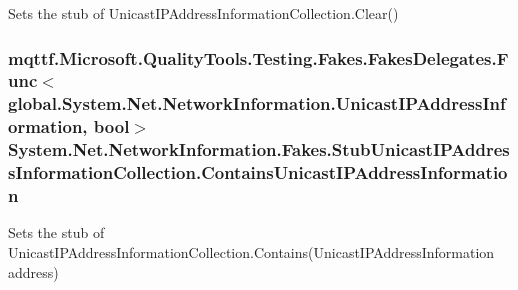 Sets the stub of Unicast\-I\-P\-Address\-Information\-Collection.\-Clear()

\hypertarget{class_system_1_1_net_1_1_network_information_1_1_fakes_1_1_stub_unicast_i_p_address_information_collection_a5dc391e839bb33351df840c9ae237cea}{
\subsubsection[{Contains\-Unicast\-I\-P\-Address\-Information}]{\setlength{\rightskip}{0pt plus 5cm}mqttf.\-Microsoft.\-Quality\-Tools.\-Testing.\-Fakes.\-Fakes\-Delegates.\-Func$<$global.\-System.\-Net.\-Network\-Information.\-Unicast\-I\-P\-Address\-Information, bool$>$ System.\-Net.\-Network\-Information.\-Fakes.\-Stub\-Unicast\-I\-P\-Address\-Information\-Collection.\-Contains\-Unicast\-I\-P\-Address\-Information}}\label{class_system_1_1_net_1_1_network_information_1_1_fakes_1_1_stub_unicast_i_p_address_information_collection_a5dc391e839bb33351df840c9ae237cea}


Sets the stub of Unicast\-I\-P\-Address\-Information\-Collection.\-Contains(\-Unicast\-I\-P\-Address\-Information address)

